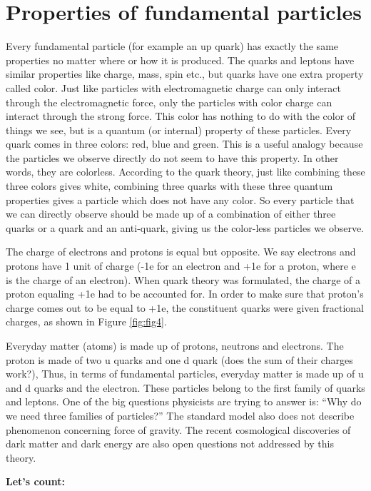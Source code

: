 \section{Properties of fundamental particles}
Every fundamental particle (for example an up quark) has exactly the same properties no matter where or how it is produced.   The quarks and leptons have similar properties like charge, mass, spin etc., but quarks have one extra property called color. Just like particles with electromagnetic charge can only interact through the electromagnetic force, only the particles with color charge can interact through the strong force. This color has nothing to do with the color of things we see, but is a quantum (or internal) property of these particles. Every quark comes in three colors: red, blue and green. This is a useful analogy because the particles we observe directly do not seem to have this property. In other words, they are colorless. According to the quark theory, just like combining these three colors gives white, combining three quarks with these three quantum properties gives a particle which does not have any color. So every particle that we can directly observe should be made up of a combination of either three quarks or a quark and an anti-quark, giving us the color-less particles we observe. 

The charge of electrons and protons is equal but opposite. We say electrons and protons have 1 unit of charge (-1e for an electron and +1e for a proton, where e is the charge of an electron). When quark theory was formulated, the charge of a proton equaling +1e had to be accounted for. In order to make sure that proton’s charge comes out to be equal to +1e, the constituent quarks were given fractional charges, as shown in Figure \ref{fig:fig4}.


Everyday matter (atoms) is made up of protons, neutrons and electrons. The proton is made of two u quarks and one d quark (does the sum of their charges work?), Thus, in terms of fundamental particles,  everyday matter is made up of u and d quarks and the electron.  These particles belong to the first family of quarks and leptons. One of the big questions physicists are trying to answer is: 
``Why do we need three families of particles?” The standard model also does not describe phenomenon concerning force of gravity. The recent cosmological discoveries of dark matter and dark energy are also open questions not addressed by this theory. 

{\bf Let’s count:} 

